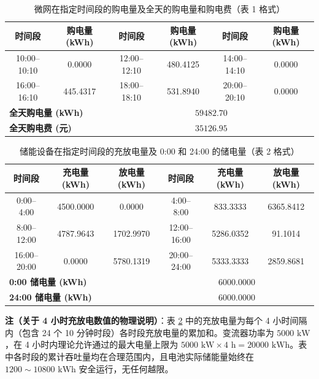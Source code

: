 \documentclass[withoutpreface]{cumcmthesis}
\begin{document}
\begin{table}[htbp]
\centering
\renewcommand{\arraystretch}{1.2}
\caption{微网在指定时间段的购电量及全天的购电量和购电费（表 1 格式）}
\label{tab:q1_table1}
\begin{tabular*}{\textwidth}{@{\extracolsep{\fill}}cccccc@{}}
\toprule[1.5pt]
时间段 & 购电量 (kWh) & 时间段 & 购电量 (kWh) & 时间段 & 购电量 (kWh) \\
\midrule[1pt]
10:00--10:10 & 0.0000   & 12:00--12:10 & 480.4125 & 14:00--14:10 & 0.0000 \\
16:00--16:10 & 445.4317 & 18:00--18:10 & 531.8940 & 20:00--20:10 & 0.0000 \\
\midrule[0.5pt]
\multicolumn{2}{l}{\textbf{全天购电量 (kWh)}} & \multicolumn{4}{c}{$59482.70$} \\
\multicolumn{2}{l}{\textbf{全天购电费 (元)}}   & \multicolumn{4}{c}{$35126.95$} \\
\bottomrule[1.5pt]
\end{tabular*}
\end{table}

\begin{table}[htbp]
\centering
\renewcommand{\arraystretch}{1.2}
\caption{储能设备在指定时间段的充放电量及 0:00 和 24:00 的储电量（表 2 格式）}
\label{tab:q1_table2}
\begin{tabular*}{\textwidth}{@{\extracolsep{\fill}}cccccc@{}}
\toprule[1.5pt]
时间段 & 充电量 (kWh) & 放电量 (kWh) & 时间段 & 充电量 (kWh) & 放电量 (kWh) \\
\midrule[1pt]
0:00--4:00   & 4500.0000 & 0.0000    & 4:00--8:00   & 833.3333  & 6365.8412 \\
8:00--12:00  & 4787.9643 & 1702.9970 & 12:00--16:00 & 5286.0352 & 91.1014   \\
16:00--20:00 & 0.0000    & 5780.1319 & 20:00--24:00 & 5333.3333 & 2859.8681 \\
\midrule[0.5pt]
\multicolumn{3}{l}{\textbf{0:00 储电量 (kWh)}}  & \multicolumn{3}{c}{$6000.0000$} \\
\multicolumn{3}{l}{\textbf{24:00 储电量 (kWh)}} & \multicolumn{3}{c}{$6000.0000$} \\
\bottomrule[1.5pt]
\end{tabular*}
\vspace{0.3em}
\parbox{\textwidth}{\footnotesize\textbf{注（关于 4 小时充放电数值的物理说明）}：表 \ref{tab:q1_table2} 中的充放电量为每个 4 小时间隔内（包含 24 个 10 分钟时段）各时段充放电量的累加和。变流器功率为 $5000\text{ kW}$，在 4 小时内理论允许通过的最大电量上限为 $5000\text{ kW} \times 4\text{ h} = 20000\text{ kWh}$。表中各时段的累计吞吐量均在合理范围内，且电池实际储能量始终在 $1200 \sim 10800\text{ kWh}$ 安全运行，无任何越限。}
\end{table}
\end{document}
